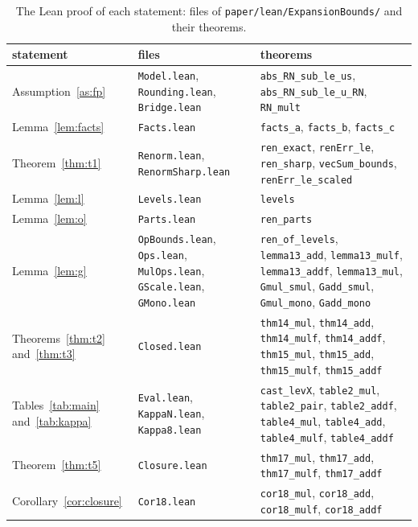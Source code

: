 \begin{table}[tp]
\centering
\caption{The Lean proof of each statement: files of \texttt{paper/lean/ExpansionBounds/} and their theorems.}
\label{tab:lean}
\footnotesize
\begin{tabular}{@{}>{\raggedright\arraybackslash}p{3.3cm}>{\raggedright\arraybackslash}p{5.0cm}>{\raggedright\arraybackslash}p{8.6cm}@{}}
\toprule
statement & files & theorems \\
\midrule
Assumption~\ref{as:fp} & \texttt{Model.lean}, \texttt{Rounding.lean}, \texttt{Bridge.lean} &
  \texttt{abs\_RN\_sub\_le\_us}, \texttt{abs\_RN\_sub\_le\_u\_RN}, \texttt{RN\_mult} \\
Lemma~\ref{lem:facts} & \texttt{Facts.lean} & \texttt{facts\_a}, \texttt{facts\_b}, \texttt{facts\_c} \\
Theorem~\ref{thm:t1} & \texttt{Renorm.lean}, \texttt{RenormSharp.lean} &
  \texttt{ren\_exact}, \texttt{renErr\_le}, \texttt{ren\_sharp}, \texttt{vecSum\_bounds}, \texttt{renErr\_le\_scaled} \\
Lemma~\ref{lem:l} & \texttt{Levels.lean} & \texttt{levels} \\
Lemma~\ref{lem:o} & \texttt{Parts.lean} & \texttt{ren\_parts} \\
Lemma~\ref{lem:g} & \texttt{OpBounds.lean}, \texttt{Ops.lean}, \texttt{MulOps.lean}, \texttt{GScale.lean},
  \texttt{GMono.lean} & \texttt{ren\_of\_levels}, \texttt{lemma13\_add}, \texttt{lemma13\_mulf},
  \texttt{lemma13\_addf}, \texttt{lemma13\_mul}, \texttt{Gmul\_smul}, \texttt{Gadd\_smul}, \texttt{Gmul\_mono},
  \texttt{Gadd\_mono} \\
Theorems~\ref{thm:t2} and~\ref{thm:t3} & \texttt{Closed.lean} & \texttt{thm14\_mul}, \texttt{thm14\_add},
  \texttt{thm14\_mulf}, \texttt{thm14\_addf}, \texttt{thm15\_mul}, \texttt{thm15\_add}, \texttt{thm15\_mulf},
  \texttt{thm15\_addf} \\
Tables~\ref{tab:main} and~\ref{tab:kappa} & \texttt{Eval.lean}, \texttt{KappaN.lean}, \texttt{Kappa8.lean} &
  \texttt{cast\_levX}, \texttt{table2\_mul}, \texttt{table2\_pair}, \texttt{table2\_addf}, \texttt{table4\_mul},
  \texttt{table4\_add}, \texttt{table4\_mulf}, \texttt{table4\_addf} \\
Theorem~\ref{thm:t5} & \texttt{Closure.lean} & \texttt{thm17\_mul}, \texttt{thm17\_add}, \texttt{thm17\_mulf},
  \texttt{thm17\_addf} \\
Corollary~\ref{cor:closure} & \texttt{Cor18.lean} & \texttt{cor18\_mul}, \texttt{cor18\_add}, \texttt{cor18\_mulf},
  \texttt{cor18\_addf} \\

\end{tabular}
\end{table}
